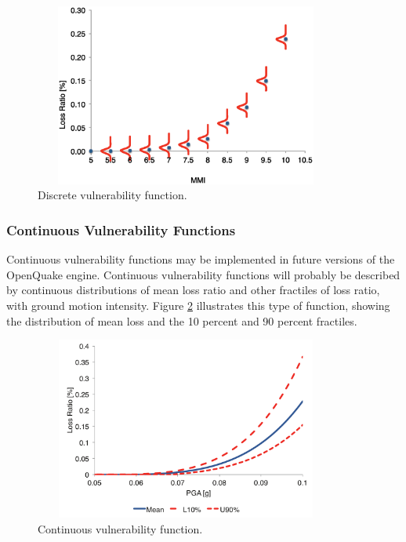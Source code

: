 \begin{figure}[ht]
\centering
\includegraphics[width=10cm,height=6cm]{./figures/risk/VFDiscrete.eps}
\caption{Discrete vulnerability function.}
\label{fig:VFDiscrete}
\end{figure}

\color{blue}
\subsubsection{Continuous Vulnerability Functions}
Continuous \glspl{vulnerability function} may be implemented in future versions of the OpenQuake engine. Continuous \glspl{vulnerability function} will probably be described by continuous distributions of mean loss ratio and other fractiles of loss ratio, with ground motion intensity. Figure \ref{fig:VFContinuous} illustrates this type of function, showing the distribution of mean loss and the 10 percent and 90 percent fractiles.

\begin{figure}[ht]
\centering
\includegraphics[width=10cm,height=6cm]{./figures/risk/VFContinuous}
\caption{Continuous vulnerability function.}
\label{fig:VFContinuous}
\end{figure}
\color{black}

